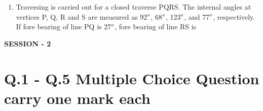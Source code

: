 \documentclass[journal,12pt,onecolumn]{article}
\theoremstyle{remark}
\begin{document}
\begin{enumerate}
\hfill{}

\item Traversing is carried out for a closed traverse PQRS. The internal angles at vertices P, Q, R and S are measured as 92$\degree$, 68$\degree$, 123$\degree$, and 77$\degree$, respectively. If fore bearing of line PQ is 27$\degree$, fore bearing of line RS  is \underline{\hspace{2cm}}

\hfill{}

\end{enumerate}




\textbf{SESSION - 2}
\section*{Q.1 - Q.5 Multiple Choice Question carry one mark each}
\end{document}
